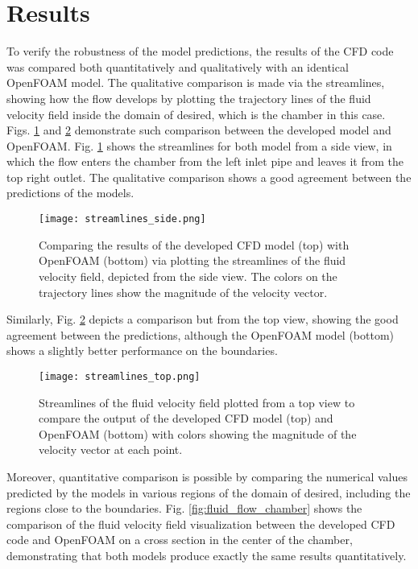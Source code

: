 \section{Results}

To verify the robustness of the model predictions, the results of the CFD code was compared both quantitatively and qualitatively with an identical  OpenFOAM model. The qualitative comparison is made via the streamlines, showing how the flow develops by plotting the trajectory lines of the fluid velocity field inside the domain of desired, which is the chamber in this case. Figs. \ref{fig:fluid_streamlines_side} and \ref{fig:fluid_streamlines_top} demonstrate such comparison between the developed model and OpenFOAM. Fig. \ref{fig:fluid_streamlines_side} shows the streamlines for both model from a side view, in which the flow enters the chamber from the left inlet pipe and leaves it from the top right outlet. The qualitative comparison shows a good agreement between the predictions of the models.

\begin{figure}[h]
\centering
\medskip
\texttt{[image: streamlines\_side.png]}
\caption[Comparing streamline results of developed CFD code and OpenFOAM - side view]{Comparing the results of the developed CFD model (top) with OpenFOAM (bottom) via plotting the streamlines of the fluid velocity field, depicted from the  side view. The colors on the trajectory lines show the magnitude of the velocity vector.} \label{fig:fluid_streamlines_side}
\end{figure}

Similarly, Fig. \ref{fig:fluid_streamlines_top} depicts a comparison but from the top view, showing the good agreement between the predictions, although the OpenFOAM model (bottom) shows a slightly better performance on the boundaries.

\begin{figure}[h]
\centering
\medskip
\texttt{[image: streamlines\_top.png]}
\caption[Comparing streamline results of developed CFD code and OpenFOAM - top view]{Streamlines of the fluid velocity field plotted from a top view to compare the output of the developed CFD model (top) and OpenFOAM (bottom)  with colors showing the magnitude of the velocity vector at each point.} \label{fig:fluid_streamlines_top}
\end{figure}

Moreover, quantitative comparison is possible by comparing the numerical values predicted by the models in various regions of the domain of desired, including the regions close to the boundaries. Fig. \ref{fig:fluid_flow_chamber} shows the comparison of the fluid velocity field visualization between the developed CFD code and OpenFOAM on a cross section in the center of the chamber, demonstrating that both models produce exactly the same results quantitatively.

